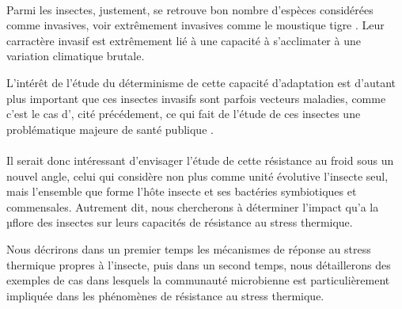 \paragraph{} %
\label{par:intro2}

Parmi les insectes, justement, se retrouve bon nombre d'espèces considérées
comme invasives, voir extrêmement invasives comme le moustique tigre
. Leur carractère invasif est extrêmement lié à une
capacité à s'acclimater à une variation climatique brutale.


L'intérêt de l'étude du déterminisme de cette capacité d'adaptation est
d'autant plus important que ces insectes invasifs sont parfois vecteurs
maladies, comme c'est le cas d', cité précédement, ce
qui fait de l'étude de ces insectes une problématique majeure de santé
publique \cite{schaffner2013}.



\paragraph{} %
\label{par:intro3}

Il serait donc intéressant d'envisager l'étude de cette résistance au froid
sous un nouvel angle, celui qui considère non plus comme unité évolutive
l'insecte seul, mais l'ensemble que forme l'hôte insecte et ses bactéries
symbiotiques et commensales. Autrement dit, nous chercherons à déterminer
l'impact qu'a la µflore des insectes sur leurs capacités de résistance au
stress thermique.

Nous décrirons dans un premier temps les mécanismes de réponse au stress
thermique propres à l'insecte, puis dans un second temps, nous détaillerons
des exemples de cas dans lesquels la communauté microbienne est
particulièrement impliquée dans les phénomènes de résistance au stress
thermique.

